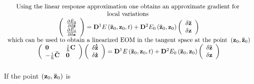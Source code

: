 \documentclass{amsart}
\begin{document}
\[
\begin{array}{c}
 \mbox{Using the linear response approximation one obtains an approximate
gradient for } \\
 \mbox{local variations } \\
 \left( {{\begin{array}{*{20}c}
 {\frac{\partial \tilde {E}_2 }{\partial \delta {\rm {\bf \bar {z}}}}}
\hfill \\
 {\frac{\partial \tilde {E}_2 }{\partial \delta {\rm {\bf z}}}} \hfill \\
\end{array} }} \right)={\rm {\bf D}}^1E\left( {{\rm {\bf \bar {z}}}_0 ,{\rm
{\bf z}}_0 ,t} \right)+{\rm {\bf D}}^2E_0 \left( {{\rm {\bf \bar {z}}}_0
,{\rm {\bf z}}_0 } \right)\left( {{\begin{array}{*{20}c}
 {\delta {\rm {\bf \bar {z}}}} \hfill \\
 {\delta {\rm {\bf z}}} \hfill \\
\end{array} }} \right) \\
 \mbox{which can be used to obtain a linearized EOM in the tangent space at
the point }\left( {{\rm {\bf z}}_0 ,{\rm {\bf \bar {z}}}_0 } \right) \\
 \left( {{\begin{array}{*{20}c}
 {\rm {\bf 0}} \hfill & {\tfrac{i}{\hbar }{\rm {\bf C}}} \hfill \\
 {-\tfrac{i}{\hbar }{\rm {\bf \bar {C}}}} \hfill & {\rm {\bf 0}} \hfill \\
\end{array} }} \right)\left( {{\begin{array}{*{20}c}
 {\delta {\rm {\bf \dot {\bar {z}}}}} \hfill \\
 {\delta {\rm {\bf \dot {z}}}} \hfill \\
\end{array} }} \right)={\rm {\bf D}}^1E\left( {{\rm {\bf \bar {z}}}_0 ,{\rm
{\bf z}}_0 ,t} \right)+{\rm {\bf D}}^2E_0 \left( {{\rm {\bf \bar {z}}}_0
,{\rm {\bf z}}_0 } \right)\left( {{\begin{array}{*{20}c}
 {\delta {\rm {\bf \bar {z}}}} \hfill \\
 {\delta {\rm {\bf z}}} \hfill \\
\end{array} }} \right) \\
 \mbox{ } \\
 \end{array}
\]
If the point $\left( {{\rm {\bf z}}_0 ,{\rm {\bf \bar {z}}}_0 } \right)$ is
\end{document}
